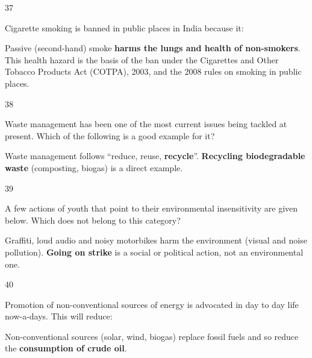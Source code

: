 \begin{question}{37}
{Cigarette smoking is banned in public places in India because it:\par}
\begin{explain}
Passive (second-hand) smoke \textbf{harms the lungs and health of non-smokers}. This health hazard is the basis of the ban under the Cigarettes and Other Tobacco Products Act (COTPA), 2003, and the 2008 rules on smoking in public places.
\end{explain}
\end{question}

\begin{question}{38}
{Waste management has been one of the most current issues being tackled at present. Which of the following is a good example for it?\par}
\begin{explain}
Waste management follows ``reduce, reuse, \textbf{recycle}''. \textbf{Recycling biodegradable waste} (composting, biogas) is a direct example.
\end{explain}
\end{question}

\begin{question}{39}
{A few actions of youth that point to their environmental insensitivity are given below. Which does not belong to this category?\par}
\begin{explain}
Graffiti, loud audio and noisy motorbikes harm the environment (visual and noise pollution). \textbf{Going on strike} is a social or political action, not an environmental one.
\end{explain}
\end{question}

\begin{question}{40}
{Promotion of non-conventional sources of energy is advocated in day to day life now-a-days. This will reduce:\par}
\begin{explain}
Non-conventional sources (solar, wind, biogas) replace fossil fuels and so reduce the \textbf{consumption of crude oil}.
\end{explain}
\end{question}


